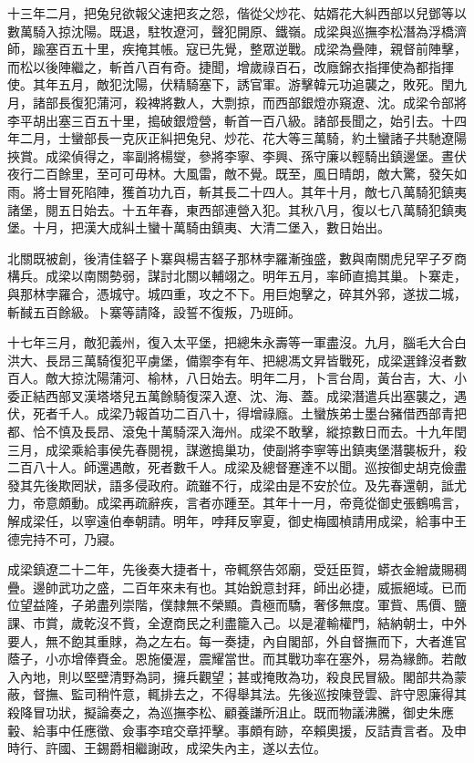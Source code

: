 \begin{pinyinscope}
十三年二月，把兔兒欲報父速把亥之怨，偕從父炒花、姑婿花大糾西部以兒鄧等以數萬騎入掠沈陽。既退，駐牧遼河，聲犯開原、鐵嶺。成梁與巡撫李松潛為浮橋濟師，踰塞百五十里，疾掩其帳。寇已先覺，整眾逆戰。成梁為疊陣，親督前陣擊，而松以後陣繼之，斬首八百有奇。捷聞，增歲祿百石，改廕錦衣指揮使為都指揮使。其年五月，敵犯沈陽，伏精騎塞下，誘官軍。游擊韓元功追襲之，敗死。閏九月，諸部長復犯蒲河，殺裨將數人，大剽掠，而西部銀燈亦窺遼、沈。成梁令部將李平胡出塞三百五十里，搗破銀燈營，斬首一百八級。諸部長聞之，始引去。十四年二月，士蠻部長一克灰正糾把兔兒、炒花、花大等三萬騎，約土蠻諸子共馳遼陽挾賞。成梁偵得之，率副將楊燮，參將李寧、李興、孫守廉以輕騎出鎮邊堡。晝伏夜行二百餘里，至可可毋林。大風雷，敵不覺。既至，風日晴朗，敵大驚，發矢如雨。將士冒死陷陣，獲首功九百，斬其長二十四人。其年十月，敵七八萬騎犯鎮夷諸堡，閱五日始去。十五年春，東西部連營入犯。其秋八月，復以七八萬騎犯鎮夷堡。十月，把漢大成糾土蠻十萬騎由鎮夷、大清二堡入，數日始出。

北關既被創，後清佳砮子卜寨與楊吉砮子那林孛羅漸強盛，數與南關虎兒罕子歹商構兵。成梁以南關勢弱，謀討北關以輔翊之。明年五月，率師直搗其巢。卜寨走，與那林孛羅合，憑城守。城四重，攻之不下。用巨炮擊之，碎其外郛，遂拔二城，斬馘五百餘級。卜寨等請降，設誓不復叛，乃班師。

十七年三月，敵犯義州，復入太平堡，把總朱永壽等一軍盡沒。九月，腦毛大合白洪大、長昂三萬騎復犯平虜堡，備禦李有年、把總馮文昇皆戰死，成梁選鋒沒者數百人。敵大掠沈陽蒲河、榆林，八日始去。明年二月，卜言台周，黃台吉，大、小委正結西部叉漢塔塔兒五萬餘騎復深入遼、沈、海、蓋。成梁潛遣兵出塞襲之，遇伏，死者千人。成梁乃報首功二百八十，得增祿廕。土蠻族弟士墨台豬借西部青把都、恰不慎及長昂、滾兔十萬騎深入海州。成梁不敢擊，縱掠數日而去。十九年閏三月，成梁乘給事侯先春閱視，謀邀搗巢功，使副將李寧等出鎮夷堡潛襲板升，殺二百八十人。師還遇敵，死者數千人。成梁及總督蹇達不以聞。巡按御史胡克儉盡發其先後欺罔狀，語多侵政府。疏雖不行，成梁由是不安於位。及先春還朝，詆尤力，帝意頗動。成梁再疏辭疾，言者亦踵至。其年十一月，帝竟從御史張鶴鳴言，解成梁任，以寧遠伯奉朝請。明年，哱拜反寧夏，御史梅國楨請用成梁，給事中王德完持不可，乃寢。

成梁鎮遼二十二年，先後奏大捷者十，帝輒祭告郊廟，受廷臣賀，蟒衣金繒歲賜稠疊。邊帥武功之盛，二百年來未有也。其始銳意封拜，師出必捷，威振絕域。已而位望益隆，子弟盡列崇階，僕隸無不榮顯。貴極而驕，奢侈無度。軍貲、馬價、鹽課、市賞，歲乾沒不貲，全遼商民之利盡籠入己。以是灌輸權門，結納朝士，中外要人，無不飽其重賕，為之左右。每一奏捷，內自閣部，外自督撫而下，大者進官蔭子，小亦增俸賚金。恩施優渥，震耀當世。而其戰功率在塞外，易為緣飾。若敵入內地，則以堅壁清野為詞，擁兵觀望；甚或掩敗為功，殺良民冒級。閣部共為蒙蔽，督撫、監司稍忤意，輒排去之，不得舉其法。先後巡按陳登雲、許守恩廉得其殺降冒功狀，擬論奏之，為巡撫李松、顧養謙所沮止。既而物議沸騰，御史朱應轂、給事中任應徵、僉事李琯交章抨擊。事頗有跡，卒賴奧援，反詰責言者。及申時行、許國、王錫爵相繼謝政，成梁失內主，遂以去位。


\end{pinyinscope}
